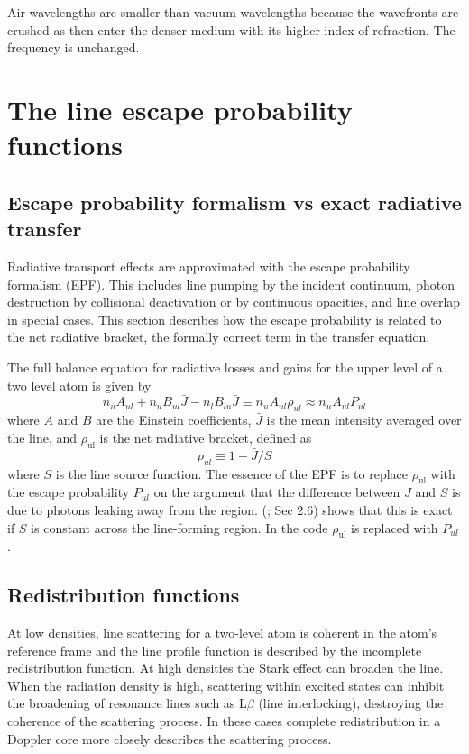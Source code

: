 Air wavelengths are smaller than vacuum wavelengths because the wavefronts
are crushed as then enter the denser medium with its higher index of
refraction.
The frequency is unchanged.

\section{The line escape probability functions }

\subsection{Escape probability formalism vs exact radiative transfer }

Radiative transport effects are approximated with the escape probability
formalism (EPF).  This includes line pumping by the incident continuum,
photon destruction by collisional deactivation or by continuous opacities,
and line overlap in special cases.  This section describes how the escape
probability is related to the net radiative bracket, the formally correct
term in the transfer equation.

The full balance equation for radiative losses and gains for the upper
level of a two level atom is given by
\begin{equation}
{n_u}{A_{ul}} + {n_u}{B_{ul}}\bar J - {n_l}{B_{lu}}\bar J \equiv
{n_u}{A_{ul}}{\rho _{ul}} \approx {n_u}{A_{ul}}{P_{ul}}%
\end{equation}
where $A$ and $B$ are the Einstein coefficients, $\bar J$
is the mean intensity averaged over the line,
and $\rho_{\mathrm{ul}}$ is the net radiative bracket, defined as
\begin{equation}
{\rho _{ul}} \equiv 1 - \bar J/S%
\end{equation}
where $S$ is the line source function.
The essence of the EPF is to replace
$\rho_{\mathrm{ul}}$ with the escape probability $P_{ul}$ on the argument that the difference
between $J$ and $S$ is due to photons leaking away from the region.  (\citealp{Elitzur1983}; Sec 2.6) shows that this is exact
if $S$ is constant across the
line-forming region.
In the code $\rho_{\mathrm{ul}}$ is replaced with $P_{ul}$.

\subsection{Redistribution functions }

At low densities, line scattering for a two-level atom is coherent in
the atom's reference frame and the line profile function is described by
the incomplete redistribution function.
At high densities the Stark effect
can broaden the line.
When the radiation density is high, scattering within
excited states can inhibit the broadening of resonance lines such as
L$\beta$ (line
interlocking), destroying the coherence of the scattering process.
In these
cases complete redistribution in a Doppler core more closely describes the
scattering process.

